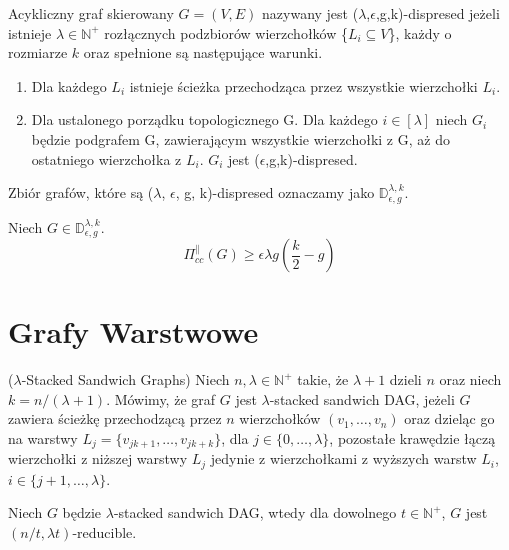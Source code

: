 \begin{definition}
	Acykliczny graf skierowany $G = (V, E)$ nazywany jest ($\lambda$,$\epsilon$,g,k)-dispresed jeżeli istnieje $\lambda \in \mathbb{N}^{+} $ rozłącznych podzbiorów wierzchołków \{$ L_{i} \subseteq V$\},
	każdy o rozmiarze $k$ oraz spełnione są następujące warunki.
	\begin{enumerate}
		\item Dla każdego $L_{i}$ istnieje ścieżka przechodząca przez wszystkie wierzchołki $L_{i}$.
		
		\item Dla ustalonego porządku topologicznego G. Dla każdego $i \in [\lambda]$ niech
		$G_{i}$ będzie podgrafem G, zawierającym wszystkie wierzchołki z G, aż do ostatniego wierzchołka z $L_{i}$. $G_{i}$ jest ($\epsilon$,g,k)-dispresed.
	\end{enumerate}
	Zbiór grafów, które są ($\lambda$, $\epsilon$, g, k)-dispresed oznaczamy jako $\mathbb{D}_{\epsilon,g}^{\lambda,k}$.
\end{definition}

\begin{theorem}
	Niech $G \in \mathbb{D}_{\epsilon,g}^{\lambda,k}$.
	$$ \Pi_{cc}^{\parallel}(G) \geq \epsilon \lambda g \left( \frac{k}{2} - g \right) $$
\end{theorem}


\section{Grafy Warstwowe}

\begin{definition}
	($\lambda$-Stacked Sandwich Graphs) Niech $n, \lambda \in \mathbb{N}^{+}$ takie, że $\lambda + 1$ dzieli $n$ oraz niech $k=n/(\lambda + 1)$. Mówimy, że graf $G$ jest $\lambda$-stacked sandwich DAG, jeżeli $G$ zawiera ścieżkę przechodzącą przez $n$ wierzchołków $(v_{1},\dots,v_{n})$ oraz dzieląc go na warstwy $L_{j} = \{v_{jk + 1},\dots,v_{jk + k} \}$, dla $j \in \{0,\dots,\lambda\}$, pozostałe krawędzie łączą wierzchołki z niższej warstwy $L_{j}$ jedynie z wierzchołkami z wyższych warstw $L_{i}$, $i \in \{ j+1,\dots,\lambda \}$.
\end{definition}



\begin{lemma}
	Niech $G$ będzie $\lambda$-stacked sandwich DAG, wtedy dla dowolnego $t \in \mathbb{N}^{+}$, $G$ jest $(n/t, \lambda t)$-reducible.
\end{lemma}


